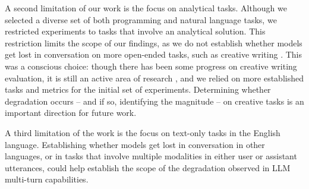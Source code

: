 \documentclass{article}
\begin{document}
A second limitation of our work is the focus on analytical tasks. Although we selected a diverse set of both programming and natural language tasks, we restricted experiments to tasks that involve an analytical solution. This restriction limits the scope of our findings, as we do not establish whether models get lost in conversation on more open-ended tasks, such as creative writing \cite{chakrabarty2024art}. This was a conscious choice: though there has been some progress on creative writing evaluation, it is still an active area of research \cite{chakrabarty2025ai}, and we relied on more established tasks and metrics for the initial set of experiments. Determining whether degradation occurs -- and if so, identifying the magnitude -- on creative tasks is an important direction for future work.

A third limitation of the work is the focus on text-only tasks in the English language. Establishing whether models get lost in conversation in other languages, or in tasks that involve multiple modalities in either user or assistant utterances, could help establish the scope of the degradation observed in LLM multi-turn capabilities.






\bigskip



\end{document}
